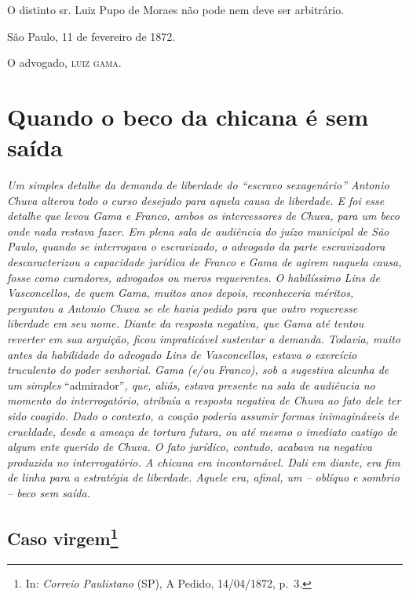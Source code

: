 {O distinto sr. Luiz Pupo de Moraes não pode nem deve ser arbitrário.

São Paulo, 11 de fevereiro de 1872.

O advogado, \textsc{luiz gama}.

\part{Quando o beco da chicana é sem saída}

\begin{didascalia}
\emph{Um simples detalhe da demanda de liberdade do ``escravo
sexagenário'' Antonio Chuva alterou todo o curso desejado para aquela
causa de liberdade. E foi esse detalhe que levou Gama e Franco, ambos os
intercessores de Chuva, para um beco onde nada restava fazer. Em plena
sala de audiência do juízo municipal de São Paulo, quando se interrogava
o escravizado, o advogado da parte escravizadora descaracterizou a
capacidade jurídica de Franco e Gama de agirem naquela causa, fosse como
curadores, advogados ou meros requerentes. O habilíssimo Lins de
Vasconcellos, de quem Gama, muitos anos depois, reconheceria méritos,
perguntou a Antonio Chuva se ele havia pedido para que outro requeresse
liberdade em seu nome. Diante da resposta negativa, que Gama até tentou
reverter em sua arguição, ficou impraticável sustentar a demanda.
Todavia, muito antes da habilidade do advogado Lins de Vasconcellos,
estava o exercício truculento do poder senhorial. Gama (e/ou Franco),
sob a sugestiva alcunha de um simples} ``admirador''\emph{, que, aliás,
estava presente na sala de audiência no momento do interrogatório,
atribuía a resposta negativa de Chuva ao fato dele ter sido coagido.
Dado o contexto, a coação poderia assumir formas inimagináveis de
crueldade, desde a ameaça de tortura futura, ou até mesmo o imediato
castigo de algum ente querido de Chuva. O fato jurídico, contudo,
acabava na negativa produzida no interrogatório. A chicana era
incontornável. Dali em diante, era fim de linha para a estratégia de
liberdade. Aquele era, afinal, um -- oblíquo e sombrio -- beco sem
saída.}
\end{didascalia}

\chapter{Caso virgem\footnote{ In: \emph{Correio Paulistano} (SP), A Pedido, 14/04/1872,
  p.~3.}} %

}
